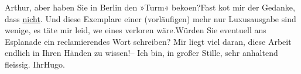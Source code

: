 \begin{ledgroupsized}[t]{13cm}
           \pstart
           Arthur, aber haben Sie in Berlin den »Turm« beko{\geminationm}en?\hspace*{1.5em}Fast ko{\geminationm}t mir der Gedanke,
               dass \uline{nicht}. Und diese Exemplare einer (vorläufigen)
               mehr nur Luxusausgabe sind wenige, es täte mir leid, we{\geminationn} eines verloren wäre.\hspace*{1.5em}Würden Sie eventuell ans Esplanade ein reclamierendes Wort schreiben? Mir liegt viel daran, diese
               Arbeit endlich in Ihren Händen zu wissen!\hspace*{1.5em}– Ich bin,
               in großer Stille, sehr anhaltend fleissig.\pend
           \pstart Ihr\spacefill\mbox{Hugo.}\pend{}          \endnumbering{}\end{ledgroupsized}  \newcommand{\dateiname}{L02454}\newcommand{\titel}{Hugo Hofmannsthal an Arthur Schnitzler, 14. 11. 1925}\newcommand{\editorInnen}{Martin Anton Müller und Gerd-Hermann Susen}
            \footnotesize
\begin{ledgroupsized}[t]{11.5cm}
\end{ledgroupsized}
         
      